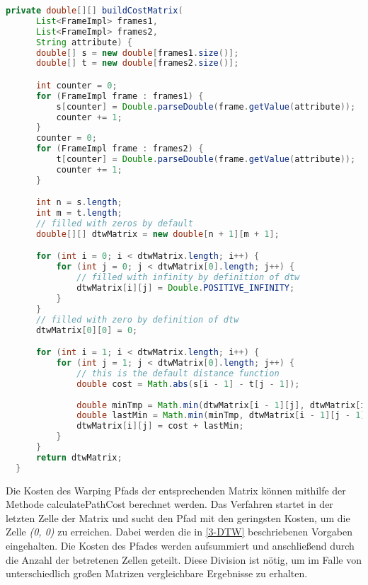 \begin{lstlisting}[language=Java, caption=DTW: Kostenmatrix.]
  private double[][] buildCostMatrix(
      List<FrameImpl> frames1,
      List<FrameImpl> frames2,
      String attribute) {
      double[] s = new double[frames1.size()];
      double[] t = new double[frames2.size()];

      int counter = 0;
      for (FrameImpl frame : frames1) {
          s[counter] = Double.parseDouble(frame.getValue(attribute));
          counter += 1;
      }
      counter = 0;
      for (FrameImpl frame : frames2) {
          t[counter] = Double.parseDouble(frame.getValue(attribute));
          counter += 1;
      }

      int n = s.length;
      int m = t.length;
      // filled with zeros by default
      double[][] dtwMatrix = new double[n + 1][m + 1];

      for (int i = 0; i < dtwMatrix.length; i++) {
          for (int j = 0; j < dtwMatrix[0].length; j++) {
              // filled with infinity by definition of dtw
              dtwMatrix[i][j] = Double.POSITIVE_INFINITY;
          }
      }
      // filled with zero by definition of dtw
      dtwMatrix[0][0] = 0;

      for (int i = 1; i < dtwMatrix.length; i++) {
          for (int j = 1; j < dtwMatrix[0].length; j++) {
              // this is the default distance function
              double cost = Math.abs(s[i - 1] - t[j - 1]);
              
              double minTmp = Math.min(dtwMatrix[i - 1][j], dtwMatrix[i][j - 1]);
              double lastMin = Math.min(minTmp, dtwMatrix[i - 1][j - 1]);
              dtwMatrix[i][j] = cost + lastMin;
          }
      }
      return dtwMatrix;
  }
\end{lstlisting}
Die Kosten des Warping Pfads der entsprechenden Matrix können mithilfe der Methode calculatePathCost
berechnet werden.
Das Verfahren startet in der letzten Zelle der Matrix und sucht den Pfad mit den geringsten Kosten,
um die Zelle \emph{(0, 0)} zu erreichen.
Dabei werden die in \autoref{3-DTW} beschriebenen Vorgaben eingehalten.
Die Kosten des Pfades werden aufsummiert und anschließend durch die Anzahl der betretenen Zellen geteilt.
Diese Division ist nötig, um im Falle von unterschiedlich großen Matrizen vergleichbare Ergebnisse zu erhalten.
